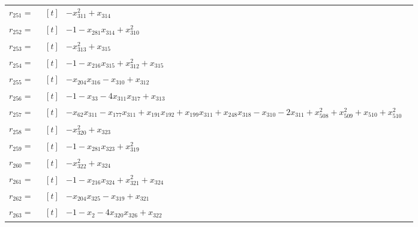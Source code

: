 \begin{longtable}{@{}r p{0.92\linewidth}@{}}
$r_{251}=$ & $\begin{aligned}[t]&-x_{311}^{2}+x_{314}\end{aligned}$ \\[2pt]
$r_{252}=$ & $\begin{aligned}[t]&-1-x_{281}x_{314}+x_{310}^{2}\end{aligned}$ \\[2pt]
$r_{253}=$ & $\begin{aligned}[t]&-x_{313}^{2}+x_{315}\end{aligned}$ \\[2pt]
$r_{254}=$ & $\begin{aligned}[t]&-1-x_{216}x_{315}+x_{312}^{2}+x_{315}\end{aligned}$ \\[2pt]
$r_{255}=$ & $\begin{aligned}[t]&-x_{204}x_{316}-x_{310}+x_{312}\end{aligned}$ \\[2pt]
$r_{256}=$ & $\begin{aligned}[t]&-1-x_{33}-4x_{311}x_{317}+x_{313}\end{aligned}$ \\[2pt]
$r_{257}=$ & $\begin{aligned}[t]&-x_{62}x_{311}-x_{177}x_{311}+x_{191}x_{192}+x_{199}x_{311}+x_{248}x_{318}-x_{310}-2x_{311}+x_{508}^{2}+x_{509}^{2}+x_{510}+x_{510}^{2}\end{aligned}$ \\[2pt]
$r_{258}=$ & $\begin{aligned}[t]&-x_{320}^{2}+x_{323}\end{aligned}$ \\[2pt]
$r_{259}=$ & $\begin{aligned}[t]&-1-x_{281}x_{323}+x_{319}^{2}\end{aligned}$ \\[2pt]
$r_{260}=$ & $\begin{aligned}[t]&-x_{322}^{2}+x_{324}\end{aligned}$ \\[2pt]
$r_{261}=$ & $\begin{aligned}[t]&-1-x_{216}x_{324}+x_{321}^{2}+x_{324}\end{aligned}$ \\[2pt]
$r_{262}=$ & $\begin{aligned}[t]&-x_{204}x_{325}-x_{319}+x_{321}\end{aligned}$ \\[2pt]
$r_{263}=$ & $\begin{aligned}[t]&-1-x_{2}-4x_{320}x_{326}+x_{322}\end{aligned}$ \\[2pt]

\end{longtable}
